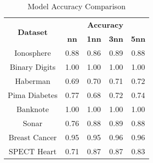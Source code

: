 \begin{table}[htbp]
\caption{Model Accuracy Comparison}
\begin{center}
\begin{tabular}{|c|c|c|c|c|}
\hline
\multirow{2}{*}{\textbf{Dataset}} & \multicolumn{4}{c|}{\textbf{Accuracy}} \\ \cline{2-5}
 & \textbf{nn} & \textbf{1nn} & \textbf{3nn} & \textbf{5nn} \\ \hline
Ionosphere & 0.88 & 0.86 & 0.89 & 0.88 \\ \hline
Binary Digits & 1.00 & 1.00 & 1.00 & 1.00 \\ \hline
Haberman & 0.69 & 0.70 & 0.71 & 0.72 \\ \hline
Pima Diabetes & 0.77 & 0.68 & 0.72 & 0.74 \\ \hline
Banknote & 1.00 & 1.00 & 1.00 & 1.00 \\ \hline
Sonar & 0.76 & 0.88 & 0.89 & 0.88 \\ \hline
Breast Cancer & 0.95 & 0.95 & 0.96 & 0.96 \\ \hline
SPECT Heart & 0.71 & 0.87 & 0.87 & 0.83 \\ \hline
\end{tabular}
\label{tab:accuracy}
\end{center}
\end{table}